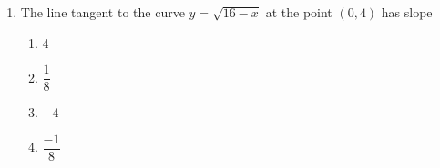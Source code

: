 \documentclass{article}
\begin{document}
\begin{enumerate}
\begin{minipage}[t]{\linewidth}
\begin{enumerate}
			\item  $\dfrac{f^{\prime} h + f h^{\prime}}{h^2}$
			\item  $\dfrac{f h^{\prime} - f^{\prime} h}{h^{2}}$
			\item  $\dfrac{f^{\prime}}{h^{\prime}}$
		\end{enumerate}
	\end{minipage}
	\item
	\begin{minipage}[t]{\linewidth}
		The line tangent to the curve \(y=\sqrt{16-x}\) at the point \((0,4)\)
has slope\\[0.1em]
		\begin{enumerate}
		\itemsep1em
			\item  4
			\item  $\dfrac{1}{8}$
			\item  $-4$
			\item  $\dfrac{-1}{8}$
		\end{enumerate}
	\end{minipage}

\end{enumerate}
\end{document}
